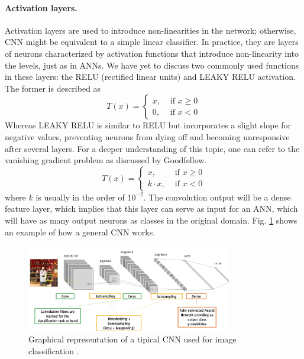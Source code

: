 \paragraph{Activation layers.} Activation layers are used to introduce non-linearities in the network; otherwise, CNN might be equivalent to a simple linear classifier. In practice, they are layers of neurons characterized by activation functions that introduce non-linearity into the levels, just as in ANNs. We have yet to discuss two commonly used functions in these layers: the RELU (rectified linear units) and LEAKY RELU activation. The former is described as
\begin{equation}
    \label{eq:RELU}
    T(x)=\left\{\begin{array}{rr}
    x, & \text { if } x \geq 0 \\
    0, & \text { if } x<0
\end{array}\right.
\end{equation}
Whereas LEAKY RELU is similar to RELU but incorporates a slight slope for negative values, preventing neurons from dying off and becoming unresponsive after several layers. For a deeper understanding of this topic, one can refer to the vanishing gradient problem as discussed by Goodfellow.
\begin{equation}
    \label{eq:LEAKYRELU}
    T(x)=\left\{\begin{array}{rr}
    x, & \text { if } x \geq 0 \\
    k\cdot x, & \text { if } x<0
\end{array}\right.
\end{equation}
where $k$ is usually in the order of $10^{-2}$.
The convolution output will be a dense feature layer, which implies that this layer can serve as input for an ANN, which will have as many output neurons as classes in the original domain. Fig. \ref{fig:typicalcnn} shows an example of how a general CNN works.
\begin{figure}[H]
    \centering
    \includegraphics[width=0.8\textwidth]{Images/CNNtypical.png}
    \caption[CNN general structure.]{Graphical representation of a tipical CNN used for image classification \cite{giacomo_boracchi_convolutional_2021}.}
    \label{fig:typicalcnn}
\end{figure}


